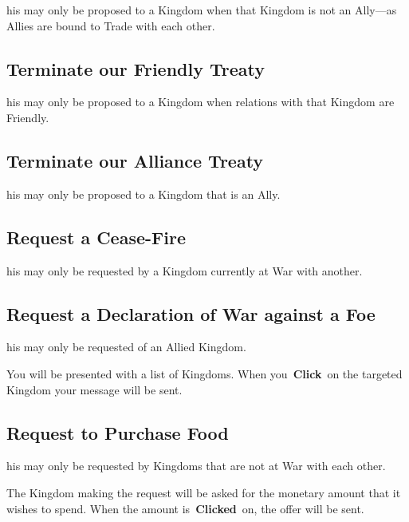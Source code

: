 his may only be proposed to a Kingdom when that Kingdom is not an Ally---as Allies are bound to Trade with each other.

\subsection{Terminate our Friendly Treaty}


his may only be proposed to a Kingdom when relations with that Kingdom are Friendly.

\subsection{Terminate our Alliance Treaty}


his may only be proposed to a Kingdom that is an Ally.

\subsection{Request a Cease-Fire}


his may only be requested by a Kingdom currently at War with another.

\subsection{Request a Declaration of War against a Foe}


his may only be requested of an Allied Kingdom.

You will be presented with a list of Kingdoms. When you \textbf{Click} on the targeted Kingdom your message will be sent.

\subsection{Request to Purchase Food}


his may only be requested by Kingdoms that are not at War with each other.

The Kingdom making the request will be asked for the monetary amount that it wishes to spend. When the amount is \textbf{Clicked} on, the offer will be sent.

